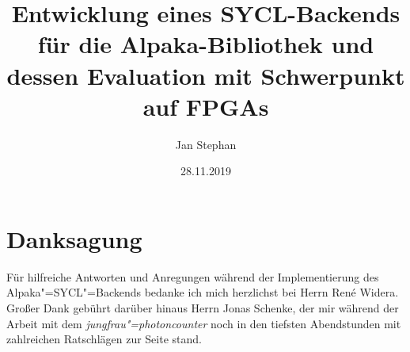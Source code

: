 \documentclass[english,greek,ngerman,
               abstract=section,abstract=nottotoc,abstract=all,abstract=vfill,
               declaration=true,declaration=section,declaration=totoc]{tudscrbook}
\begin{document}
\department{}

\date{28.11.2019}
\title{Entwicklung eines SYCL-Backends für die Alpaka-Bibliothek und dessen
       Evaluation mit Schwerpunkt auf FPGAs}
\subject{diploma}

\author{%
        Jan Stephan%
        }



\maketitle




\tableofcontents

\glsaddall
\printglossary
\printglossary[type=\acronymtype]











\printbibliography[heading=bibintoc]

\listoffigures
\listoftables
\listoflistings

\appendix


\chapter*{Danksagung}
Für hilfreiche Antworten und Anregungen während der Implementierung des
Alpaka"=SYCL"=Backends bedanke ich mich herzlichst bei Herrn René Widera.
Großer Dank gebührt darüber hinaus Herrn Jonas Schenke, der mir während der
Arbeit mit dem \textit{jungfrau"=photoncounter} noch in den tiefsten
Abendstunden mit zahlreichen Ratschlägen zur Seite stand.

\newpage\null\thispagestyle{empty}\newpage

\confirmation[language=ngerman]
\end{document}
